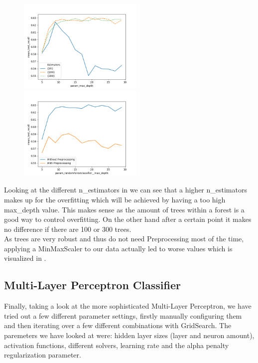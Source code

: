 \begin{figure}
\begin{floatrow}
    {\includegraphics[width=6cm]{onlineshop/plots/rfc_n_estimators_comparison.png}\label{fig:rf_n_estim}}
    {\includegraphics[width=6cm]{onlineshop/plots/rfc_preprocessing_comparison.png}\label{fig:rfc_pre}}
\end{floatrow}
\end{figure}
Looking at the different n\_estimators in  we can see that a higher n\_estimators makes up for the overfitting which will be achieved by having a too high max\_depth value. This makes sense as the amount of trees within a forest is a good way to control overfitting. On the other hand after a certain point it makes no difference if there are 100 or 300 trees. \\
\newline
As trees are very robust and thus do not need Preprocessing most of the time, applying a MinMaxScaler to our data actually led to worse values which is visualized in .

\subsection{Multi-Layer Perceptron Classifier}
Finally, taking a look at the more sophisticated Multi-Layer Perceptron, we have tried out a few different parameter settings, firstly manually configuring them and then iterating over a few different combinations with GridSearch. The paremeters we have looked at were: hidden layer sizes (layer and neuron amount), activation functions, different solvers, learning rate and the alpha penalty regularization parameter.


